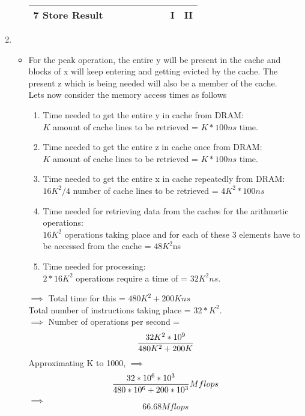 \documentclass[11pt]{article}
\begin{document}
\begin{enumerate}
\begin{itemize}
\begin{table}[!htb]
\begin{tabular}{|c|c|l|c|c|c|c|c|c|c|c|c|}
7 Store Result                            & \multicolumn{2}{c|}{\multirow{-6}{*}{}}                               & \multirow{-5}{*}{\cellcolor[HTML]{FFFFFF}} & \multirow{-4}{*}{}        & \multirow{-3}{*}{}         & \multirow{-2}{*}{}         &                             & \multicolumn{2}{c|}{\cellcolor[HTML]{6434FC}I}            & \multicolumn{2}{c|}{\cellcolor[HTML]{00D2CB}II}                               \\ \hline
\end{tabular}
\end{table}
	\end{itemize}
\item %
	\begin{itemize}
			\item For the peak operation, the entire y will be present in the cache and blocks of x will keep entering and getting evicted by the cache. The present z which is being needed will also be a member of the cache.\\
				Lets now consider the memory access times as follows\\
				\begin{enumerate}
					\item Time needed to get the entire y in cache from DRAM: \\
							$K$ amount of cache lines to be retrieved = $K*100ns$ time. 
					\item Time needed to get the entire z in cache once from DRAM: \\
							$K$ amount of cache lines to be retrieved = $K*100ns$ time. 
					\item Time needed to get the entire x in cache repeatedly from DRAM: \\
							$16K^2/4$ number of cache lines to be retrieved = $4K^2*100ns$ \\
					\item Time needed for retrieving data from the caches for the arithmetic operations: \\
							$16K^2$ operations taking place and for each of these 3 elements have to be accessed from the cache = $ 48K^2$ns\\
					\item Time needed for processing:\\
							$2*16K^2$ operations require a time of = $32K^2 ns$. 
				\end{enumerate}
				$\implies$ Total time for this = $480K^2 + 200K ns$ \\
				Total number of instructions taking place = $32*K^2$.\\
				$\implies$ Number of operations per second = \[ 
						\frac{32 K^2 *10^9}{480K^2 + 200K} \\
				\]
				Approximating K to 1000, $\implies$  \[
						\frac{32 * 10^6 *10^3}{480* 10^6 + 200*10^3} Mflops \\
				\]
				$\implies$ \[
						66.68 Mflops
					\]


\end{itemize}
\end{enumerate}
\end{document}
